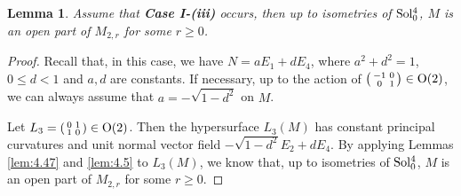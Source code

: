 \documentclass[reqno]{amsart}%
\newtheorem{lemma}[theorem]{Lemma}
\theoremstyle{definition}
\numberwithin{equation}{section}
\begin{document}
	\begin{lemma}\label{lem:4.6}
		Assume that {\bf Case I-(iii)} occurs, then up to isometries of ${\rm Sol_0^4}$,
		$M$ is an open part of $M_{2,r}$ for some $r\geq0$.
	\end{lemma}
	
	\begin{proof}
		Recall that, in this case, we have $N=aE_1+dE_4$, where $a^2+d^2=1$,
		$0\leq d<1$ and $a,d$ are constants.
		If necessary, up to the action of
		$\left(
		\begin{smallmatrix}
			-1 & 0 \\
			0 & 1 \\
		\end{smallmatrix}
		\right)\in {\rm O(2)}$, we can always assume that $a=-\sqrt{1-d^2}$ on $M$.
		
		Let $L_3=\left(
		\begin{smallmatrix}
			0 & 1 \\
			1 & 0 \\
		\end{smallmatrix}
		\right)\in {\rm O(2)}$.
		Then the hypersurface $L_3(M)$ has constant principal curvatures and  unit normal vector field $-\sqrt{1-d^2}E_2+dE_4$.
		By applying Lemmas \ref{lem:4.47} and \ref{lem:4.5} to $L_3(M)$,
		we know that, up to isometries of ${\rm Sol_0^4}$,
		$M$ is an open part of $M_{2,r}$ for some $r\geq0$.
	\end{proof}
	
\end{document}
